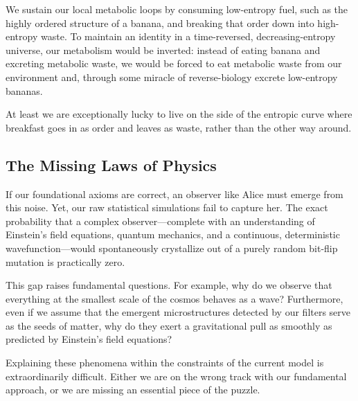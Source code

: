 We sustain our local metabolic loops by consuming low-entropy fuel, such as the highly ordered structure of a banana, and breaking that order down into high-entropy waste. 
To maintain an identity in a time-reversed, decreasing-entropy universe, our metabolism would be inverted: instead of eating banana and excreting metabolic waste, we would be forced to eat metabolic waste from our environment and, through some miracle of reverse-biology excrete low-entropy bananas.

At least we are exceptionally lucky to live on the side of the entropic curve where breakfast goes in as order and leaves as waste, rather than the other way around.

\subsection*{The Missing Laws of Physics}

If our foundational axioms are correct, an observer like Alice must emerge from this noise. 
Yet, our raw statistical simulations fail to capture her. The exact probability that a complex observer—complete with an understanding of Einstein's field equations, 
quantum mechanics, and a continuous, deterministic wavefunction—would spontaneously crystallize out of a purely random bit-flip mutation is practically zero.

This gap raises fundamental questions. For example, why do we observe that everything at the smallest scale of the cosmos behaves as a wave? 
Furthermore, even if we assume that the emergent microstructures detected by our filters serve as the seeds of matter, why do they exert a gravitational pull as smoothly as predicted by Einstein's field equations?

Explaining these phenomena within the constraints of the current model is extraordinarily difficult. 
Either we are on the wrong track with our fundamental approach, or we are missing an essential piece of the puzzle.
